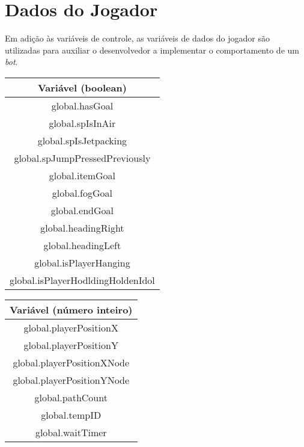 \section{Dados do Jogador}
Em adição às variáveis de controle, as variáveis de dados do jogador são
utilizadas para auxiliar o desenvolvedor a implementar o comportamento de um
\textit{bot}.

\begin{center}
    \begin{tabular}{ |c| }
        \hline
        \textbf{Variável (boolean)} \\ \hline
        global.hasGoal \\ \hline
        global.spIsInAir \\ \hline
        global.spIsJetpacking \\ \hline
        global.spJumpPressedPreviously \\ \hline
        global.itemGoal \\ \hline
        global.fogGoal \\ \hline
        global.endGoal \\ \hline
        global.headingRight \\ \hline
        global.headingLeft \\ \hline
        global.isPlayerHanging \\ \hline
        global.isPlayerHodldingHoldenIdol \\ \hline
    \end{tabular}
\end{center}

\begin{center}
    \begin{tabular}{ |c| }
        \hline
        \textbf{Variável (número inteiro)} \\ \hline
        global.playerPositionX \\ \hline
        global.playerPositionY \\ \hline
        global.playerPositionXNode \\ \hline
        global.playerPositionYNode \\ \hline
        global.pathCount \\ \hline
        global.tempID \\ \hline
        global.waitTimer \\ \hline
    \end{tabular}
\end{center}
